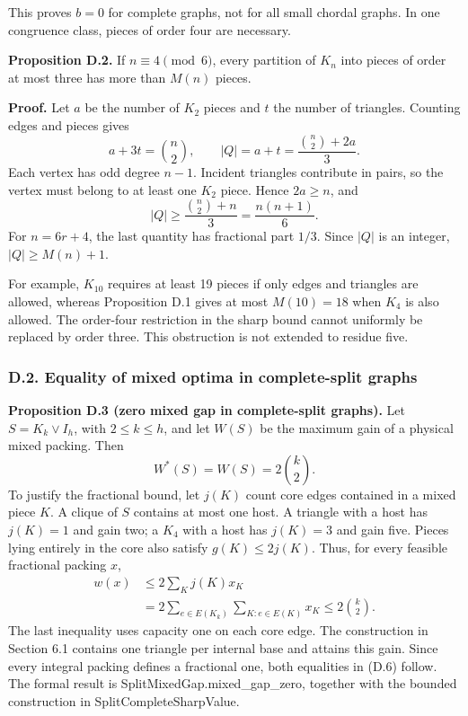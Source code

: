 \documentclass[english,11pt,a4paper]{article}
\begin{document}
This proves \(b=0\) for complete graphs, not for all small chordal graphs. In one congruence class, pieces of order four are necessary.

\textbf{Proposition D.2.} If \(n\equiv4\pmod6\), every partition of \(K_n\) into pieces of order at most three has more than \(M(n)\) pieces.

\textbf{Proof.} Let \(a\) be the number of \(K_2\) pieces and \(t\) the number of triangles. Counting edges and pieces gives \[
a+3t=\binom n2,\qquad |Q|=a+t=\frac{\binom n2+2a}{3}.
\tag{D.5}
\] Each vertex has odd degree \(n-1\). Incident triangles contribute in pairs, so the vertex must belong to at least one \(K_2\) piece. Hence \(2a\ge n\), and \[
|Q|\ge\frac{\binom n2+n}{3}=\frac{n(n+1)}6.
\] For \(n=6r+4\), the last quantity has fractional part \(1/3\). Since \(|Q|\) is an integer, \(|Q|\ge M(n)+1\).

For example, \(K_{10}\) requires at least 19 pieces if only edges and triangles are allowed, whereas Proposition D.1 gives at most \(M(10)=18\) when \(K_4\) is also allowed. The order-four restriction in the sharp bound cannot uniformly be replaced by order three. This obstruction is not extended to residue five.


\subsubsection{D.2. Equality of mixed optima in complete-split graphs}\label{d.2.-equality-of-mixed-optima-in-complete-split-graphs}

\textbf{Proposition D.3 (zero mixed gap in complete-split graphs).} Let \(S=K_k\vee I_h\), with \(2\le k\le h\), and let \(W(S)\) be the maximum gain of a physical mixed packing. Then \[
W^*(S)=W(S)=2\binom k2.
\tag{D.6}
\] To justify the fractional bound, let \(j(K)\) count core edges contained in a mixed piece \(K\). A clique of \(S\) contains at most one host. A triangle with a host has \(j(K)=1\) and gain two; a \(K_4\) with a host has \(j(K)=3\) and gain five. Pieces lying entirely in the core also satisfy \(g(K)\le2j(K)\). Thus, for every feasible fractional packing \(x\), \[
\begin{aligned}
w(x)&\le2\sum_K j(K)x_K\\
&=2\sum_{e\in E(K_k)}\sum_{K:e\in E(K)}x_K
\le2\binom k2.
\end{aligned}
\tag{D.7}
\] The last inequality uses capacity one on each core edge. The construction in Section 6.1 contains one triangle per internal base and attains this gain. Since every integral packing defines a fractional one, both equalities in (D.6) follow. The formal result is {\ttfamily\small SplitMixedGa\discretionary{\hbox{\ensuremath{\hookrightarrow}}}{}{}p.\discretionary{\hbox{\ensuremath{\hookrightarrow}}}{}{}mixed\_\discretionary{\hbox{\ensuremath{\hookrightarrow}}}{}{}gap\_\discretionary{\hbox{\ensuremath{\hookrightarrow}}}{}{}zero}, together with the bounded construction in {\ttfamily\small SplitComplet\discretionary{\hbox{\ensuremath{\hookrightarrow}}}{}{}eSharpValue}.
\end{document}

